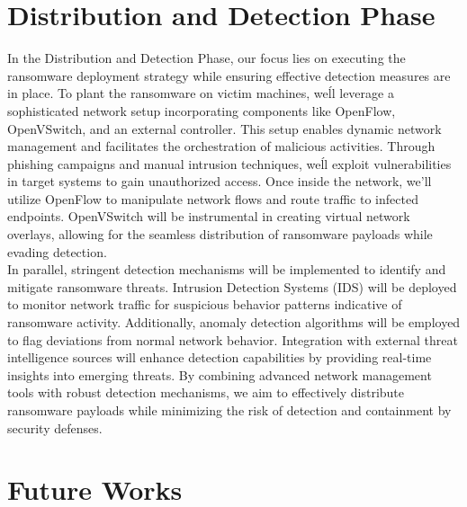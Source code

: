 \documentclass[12pt,twocolumn]{article}
\begin{document}
\section{Distribution and Detection Phase}

In the Distribution and Detection Phase, our focus lies on executing the ransomware deployment strategy while ensuring effective detection measures are in place. To plant the ransomware on victim machines, we\'ll leverage a sophisticated network setup incorporating components like OpenFlow, OpenVSwitch, and an external controller. This setup enables dynamic network management and facilitates the orchestration of malicious activities. Through phishing campaigns and manual intrusion techniques, we\'ll exploit vulnerabilities in target systems to gain unauthorized access. Once inside the network, we'll utilize OpenFlow to manipulate network flows and route traffic to infected endpoints. OpenVSwitch will be instrumental in creating virtual network overlays, allowing for the seamless distribution of ransomware payloads while evading detection.
\\
In parallel, stringent detection mechanisms will be implemented to identify and mitigate ransomware threats. Intrusion Detection Systems (IDS) will be deployed to monitor network traffic for suspicious behavior patterns indicative of ransomware activity. Additionally, anomaly detection algorithms will be employed to flag deviations from normal network behavior. Integration with external threat intelligence sources will enhance detection capabilities by providing real-time insights into emerging threats. By combining advanced network management tools with robust detection mechanisms, we aim to effectively distribute ransomware payloads while minimizing the risk of detection and containment by security defenses.









\section{Future Works}
\end{document}
